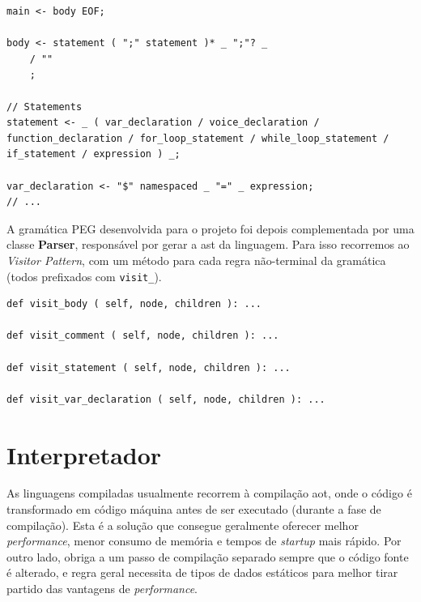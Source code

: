 \begin{lstlisting}[caption={Excerto da gramática desenvolvida}]
main <- body EOF;

body <- statement ( ";" statement )* _ ";"? _
    / ""
    ;

// Statements
statement <- _ ( var_declaration / voice_declaration / function_declaration / for_loop_statement / while_loop_statement / if_statement / expression ) _;

var_declaration <- "$" namespaced _ "=" _ expression;
// ...
\end{lstlisting}

A gramática PEG desenvolvida para o projeto foi depois complementada por uma classe \textbf{Parser}, responsável por gerar a \acrshort{ast} da linguagem. Para isso recorremos ao \textit{Visitor Pattern}, com um método para cada regra não-terminal da gramática (todos prefixados com \texttt{visit\_}).

\begin{lstlisting}[caption={Métodos responsáveis por criarem a AST}]
def visit_body ( self, node, children ): ...

def visit_comment ( self, node, children ): ...

def visit_statement ( self, node, children ): ...

def visit_var_declaration ( self, node, children ): ...
\end{lstlisting}

\section{Interpretador}
As linguagens compiladas usualmente recorrem à compilação \acrfull{aot}, onde o código é transformado em código máquina antes de ser executado (durante a fase de compilação). Esta é a solução que consegue geralmente oferecer melhor \textit{performance}, menor consumo de memória e tempos de \textit{startup} mais rápido. Por outro lado, obriga a um passo de compilação separado sempre que o código fonte é alterado, e regra geral necessita de tipos de dados estáticos para melhor tirar partido das vantagens de \textit{performance}.

